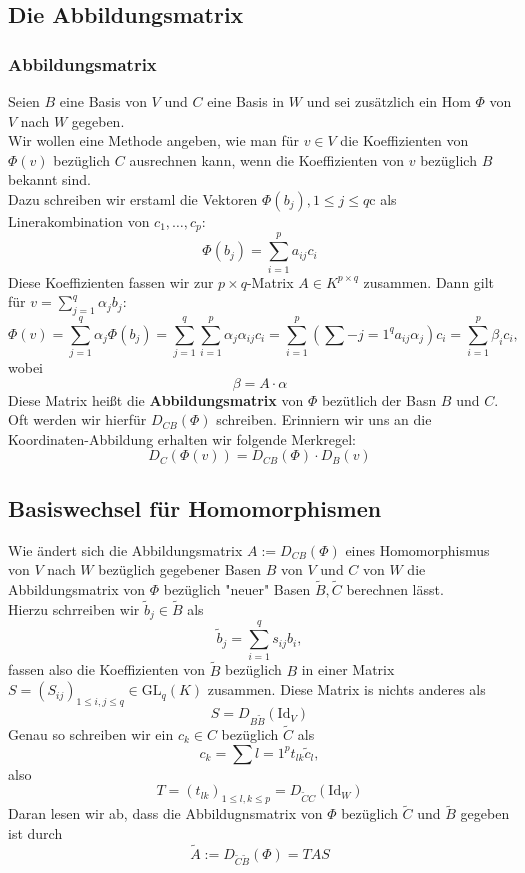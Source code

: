 \documentclass{kit}
\begin{document}
    \subsection{Die Abbildungsmatrix}
      \subsubsection{Abbildungsmatrix}
        Seien $B$ eine Basis von $V$ und $C$ eine Basis in $W$ und sei zusätzlich ein Hom $\Phi$ von $V$ nach $W$ gegeben.\\
        Wir wollen eine Methode angeben, wie man für $v\in V$ die Koeffizienten von $\Phi(v)$ bezüglich $C$ ausrechnen kann, wenn die Koeffizienten von $v$ bezüglich $B$ bekannt sind.\\
        Dazu schreiben wir erstaml die Vektoren $\Phi(b_j),1\le j\le q$c als Linerakombination von $c_1,\dots,c_p$:
        $$\Phi(b_j)=\sum_{i=1}^pa_{ij}c_i$$
        Diese Koeffizienten fassen wir zur $p\times q$-Matrix $A\in K^{p\times q}$ zusammen. Dann gilt für $v=\sum_{j=1}^q\alpha_jb_j:$
        $$\Phi(v)=\sum_{j=1}^q\alpha_j\Phi(b_j)=\sum_{j=1}^q\sum_{i=1}^p\alpha_j\alpha_{ij}c_i=\sum_{i=1}^p(\sum-{j=1}^qa_{ij}\alpha_j)c_i=\sum_{i=1}^p\beta_ic_i,$$
        wobei
        $$\beta=A\cdot\alpha$$
        Diese Matrix heißt die \textbf{Abbildungsmatrix} von $\Phi$ bezütlich der Basn $B$ und $C$. Oft werden wir hierfür $D_{CB}(\Phi)$ schreiben.
        Erinniern wir uns an die Koordinaten-Abbildung erhalten wir folgende Merkregel:
        $$D_C(\Phi(v))=D_{CB}(\Phi)\cdot D_B(v)$$
    \subsection{Basiswechsel für Homomorphismen}
      Wie ändert sich die Abbildungsmatrix $A:=D_{CB}(\Phi)$ eines Homomorphismus von $V$ nach $W$ bezüglich gegebener Basen $B$ von $V$ und $C$ von $W$ die Abbildungsmatrix von $\Phi$ bezüglich "neuer" Basen $\tilde B,\tilde C$ berechnen lässt.\\
      Hierzu schrreiben wir $\tilde b_j\in\tilde B$ als
      $$\tilde b_j=\sum_{i=1}^qs_{ij}b_i,$$
      fassen also die Koeffizienten von $\tilde B$ bezüglich $B$ in einer Matrix $S=(S_{ij})_{1\le i,j\le q}\in\text{GL}_q(K)$ zusammen. Diese Matrix is nichts anderes als
      $$S=D_{B\tilde B}(\text{Id}_V)$$
      Genau so schreiben wir ein $c_k\in C$ bezüglich $\tilde C$ als
      $$c_k=\sum{l=1}^pt_{lk}\tilde c_l,$$
      also
      $$T=(t_{lk})_{1\le l,k\le p}=D_{\tilde CC}(\text{Id}_W)$$
      Daran lesen wir ab, dass die Abbildugnsmatrix von $\Phi$ bezüglich $\tilde C$ und $\tilde B$ gegeben ist durch
      \textbf{$$\tilde A:=D_{\tilde C\tilde B}(\Phi)=TAS$$}
\end{document}
